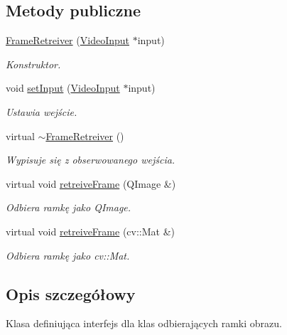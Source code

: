 \subsection*{Metody publiczne}
\begin{CompactItemize}
\item 
\hyperlink{class_frame_retreiver_ec5e4a7cd0af2badc9b47fd3c936ac60}{FrameRetreiver} (\hyperlink{class_video_input}{VideoInput} $\ast$input)
\begin{CompactList}\small\item\em Konstruktor. \item\end{CompactList}\item 
void \hyperlink{class_frame_retreiver_8d7772f0a3d6373f5a54bf4fcc042ccc}{setInput} (\hyperlink{class_video_input}{VideoInput} $\ast$input)
\begin{CompactList}\small\item\em Ustawia wejście. \item\end{CompactList}\item 
\hypertarget{class_frame_retreiver_2345c5f4273008325ecfaf84f63d001c}{
virtual \hyperlink{class_frame_retreiver_2345c5f4273008325ecfaf84f63d001c}{$\sim$FrameRetreiver} ()}
\label{class_frame_retreiver_2345c5f4273008325ecfaf84f63d001c}

\begin{CompactList}\small\item\em Wypisuje się z obserwowanego wejścia. \item\end{CompactList}\item 
virtual void \hyperlink{class_frame_retreiver_061c97e43f3b73705903e49afad3e5bf}{retreiveFrame} (QImage \&)
\begin{CompactList}\small\item\em Odbiera ramkę jako QImage. \item\end{CompactList}\item 
virtual void \hyperlink{class_frame_retreiver_72912583af45c00d267f215a0d0b9bb1}{retreiveFrame} (cv::Mat \&)
\begin{CompactList}\small\item\em Odbiera ramkę jako cv::Mat. \item\end{CompactList}\end{CompactItemize}


\subsection{Opis szczegółowy}
Klasa definiująca interfejs dla klas odbierających ramki obrazu. 

